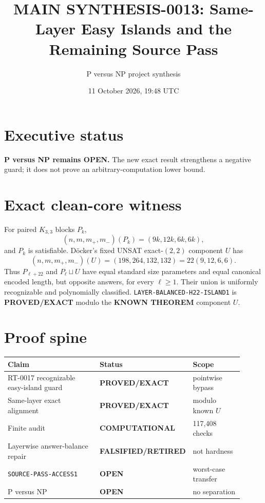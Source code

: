 \documentclass[11pt]{article}
\title{MAIN SYNTHESIS-0013: Same-Layer Easy Islands and the Remaining Source Pass}
\author{P versus NP project synthesis}
\date{11 October 2026, 19:48 UTC}
\begin{document}
\maketitle

\section*{Executive status}
\textbf{P versus NP remains OPEN.}  The new exact result strengthens a
negative guard; it does not prove an arbitrary-computation lower bound.

\section*{Exact clean-core witness}
For paired $K_{3,3}$ blocks $P_k$,
\[
 (n,m,m_+,m_-)(P_k)=(9k,12k,6k,6k),
\]
and $P_k$ is satisfiable.  D\"ocker's fixed UNSAT exact-$(2,2)$ component
$U$ has
\[
 (n,m,m_+,m_-)(U)=(198,264,132,132)=22(9,12,6,6).
\]
Thus $P_{\ell+22}$ and $P_\ell\sqcup U$ have equal standard size parameters
and equal canonical encoded length, but opposite answers, for every
$\ell\ge1$.  Their union is uniformly recognizable and polynomially
classified.  \texttt{LAYER-BALANCED-H22-ISLAND1} is
\textbf{PROVED/EXACT} modulo the \textbf{KNOWN THEOREM} component $U$.

\section*{Proof spine}
\begin{center}\small
\begin{tabular}{p{0.46\linewidth}p{0.22\linewidth}p{0.23\linewidth}}
\hline
Claim & Status & Scope\\\hline
RT-0017 recognizable easy-island guard & \textbf{PROVED/EXACT} & pointwise bypass\\
Same-layer exact alignment & \textbf{PROVED/EXACT} & modulo known $U$\\
Finite audit & \textbf{COMPUTATIONAL} & 117,408 checks\\
Layerwise answer-balance repair & \textbf{FALSIFIED/RETIRED} & not hardness\\
\texttt{SOURCE-PASS-ACCESS1} & \textbf{OPEN} & worst-case transfer\\
P versus NP & \textbf{OPEN} & no separation\\\hline
\end{tabular}
\end{center}
\end{document}
